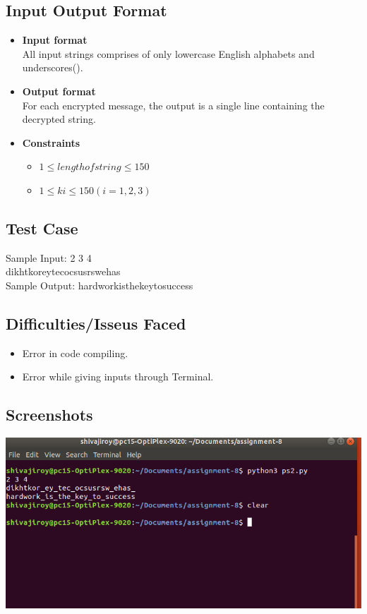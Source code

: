 \documentclass[a4paper,12pt]{article}
\begin{document}
\subsection{Input Output Format}
\begin{itemize}
\item \textbf{Input format} \\
All input strings comprises of only lowercase English alphabets and underscores(\textunderscore).\\
\item \textbf{Output format}\\
For each encrypted message, the output is a single line containing the decrypted string. \\
\item \textbf{Constraints} \\
\begin{itemize}
\item $1 \leqslant length of string \leqslant 150$
\item $1 \leqslant ki \leqslant 150(i=1,2,3)$
\end{itemize}
\end{itemize}

\subsection{Test Case}
Sample Input:  2 3 4\\
			   dikhtkor\textunderscore ey\textunderscore tec\textunderscore ocsusrsw\textunderscore ehas\textunderscore \\

Sample Output:  hardworkis\textunderscore the\textunderscore key\textunderscore to\textunderscore success

\subsection{Difficulties/Isseus Faced}
\begin{itemize}
\item Error in code compiling.
\item Error while giving inputs through Terminal.
\end{itemize}
\subsection{Screenshots}

\includegraphics[scale=0.35]{Screenshot2.png}
\end{document}
